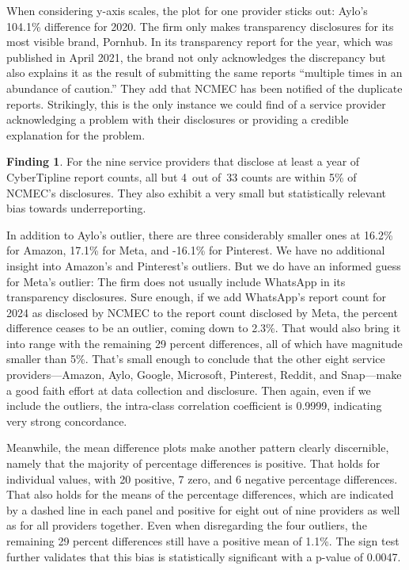 \documentclass[anonymous,nonacm,screen,12pt]{acmart}
\newcommand\V[1]{{#1}}
\newcommand\V[1]{\textsc{\MakeLowercase{#1}}}
\theoremstyle{definition}
\newtheorem{finding}{Finding}
\begin{document}
\noindent{}When considering y-axis scales, the plot for one provider sticks out:
Aylo's 104.1\% difference for 2020. The firm only makes transparency disclosures
for its most visible brand, Pornhub. In its transparency report for the year,
which was published in April 2021, the brand not only acknowledges the
discrepancy but also explains it as the result of submitting the same reports
``multiple times in an abundance of caution.'' They add that \V{NCMEC} has been
notified of the duplicate reports. Strikingly, this is the only instance we
could find of a service provider acknowledging a problem with their disclosures
or providing a credible explanation for the problem.


\begin{finding}
For the nine service providers that disclose at least a year of CyberTipline
report counts, all but 4~out of~33 counts are within 5\% of \V{NCMEC}'s
disclosures. They also exhibit a very small but statistically relevant bias
towards underreporting.
\end{finding}

\noindent{}In addition to Aylo's outlier, there are three considerably smaller
ones at 16.2\% for Amazon, 17.1\% for Meta, and -16.1\% for Pinterest. We have
no additional insight into Amazon's and Pinterest's outliers. But we do have an
informed guess for Meta's outlier: The firm does not usually include WhatsApp in
its transparency disclosures. Sure enough, if we add WhatsApp's report count for
2024 as disclosed by \V{NCMEC} to the report count disclosed by Meta, the
percent difference ceases to be an outlier, coming down to 2.3\%. That would
also bring it into range with the remaining 29 percent differences, all of which
have magnitude smaller than 5\%. That's small enough to conclude that the other
eight service providers---Amazon, Aylo, Google, Microsoft, Pinterest, Reddit,
and Snap---make a good faith effort at data collection and disclosure. Then
again, even if we include the outliers, the intra-class correlation coefficient
is 0.9999, indicating very strong concordance.

Meanwhile, the mean difference plots make another pattern clearly discernible,
namely that the majority of percentage differences is positive. That holds for
individual values, with 20 positive, 7 zero, and 6 negative percentage
differences. That also holds for the means of the percentage differences, which
are indicated by a dashed line in each panel and positive for eight out of nine
providers as well as for all providers together. Even when disregarding the four
outliers, the remaining 29 percent differences still have a positive mean of
1.1\%. The sign test further validates that this bias is statistically
significant with a p-value of 0.0047.
\end{document}
